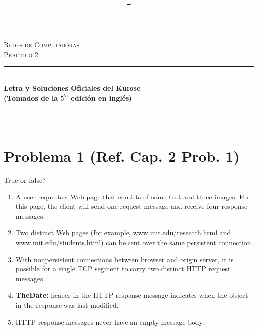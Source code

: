 \documentclass[10pt,spanish]{article}
\title{\Practico - \Titulo}
\newcommand{\Practico}{Practico 2}
\newcommand{\Titulo}{Letra y Soluciones Oficiales del Kurose}
\newcommand{\Materia}{Redes de Computadoras}
\numberwithin{figure}{section} %
\begin{document}
\vspace*{\fill}
\begin{center}																		%
\newcommand{\HRule}{\rule{\linewidth}{0.5mm}}							
\textsc{\huge \Materia}\\[1.5cm]	

\textsc{\huge \Practico				%
}\\[1.5cm]													%
\vspace*{5cm}																		%
\HRule \\[0.4cm]																	%
{ \huge \bfseries \Titulo \\ \Large(Tomados de la $5^{ta}$ edición en inglés)}\\[0.3cm]	%
\HRule \\[4cm]																	%
																		
\end{center}							 								\vspace*{\fill}		
																					
\newpage
\tableofcontents

\newpage
\section[Problema 1]{Problema 1 \textnormal{\Large{(Ref. Cap. 2 Prob. 1)}}}
True or false?
\renewcommand{\theenumi}{\alph{enumi}} %
\begin{enumerate}
\item A user requests a Web page that consists of some text and three images. For this page, the client will send one request message and receive four response messages.
\item Two distinct Web pages (for example, \url{www.mit.edu/research.html} and \url{www.mit.edu/students.html}) can be sent over the same persistent connection.
\item With nonpersistent connections between browser and origin server, it is possible for a single TCP segment to carry two distinct HTTP request messages.
\item \textbf{TheDate:} header in the HTTP response message indicates when the object in the response was last modified.
\item HTTP response messages never have an empty message body.
\end{enumerate}
\end{document}
